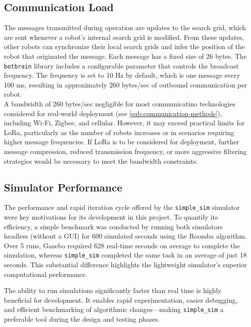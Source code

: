 \subsection{Communication Load}
The messages transmitted during operation are updates to the search grid, which are sent whenever a robot’s internal search grid is modified. From these updates, other robots can synchronize their local search grids and infer the position of the robot that originated the message. Each message has a fixed size of 26 bytes. The \texttt{botbrain} library includes a configurable parameter that controls the broadcast frequency. The frequency is set to 10 Hz by default, which is one message every 100 ms, resulting in approximately 260 bytes/sec of outbound communication per robot. \\

A bandwidth of 260 bytes/sec negligible for most communicatino technologies considered for real-world deployment (see \cref{sub:communication-methods}), including Wi-Fi, Zigbee, and cellular. However, it may exceed practical limits for LoRa, particularly as the number of robots increases or in scenarios requiring higher message frequencies. If LoRa is to be considered for deployment, further message compression, reduced transmission frequency, or more aggressive filtering strategies would be necessary to meet the bandwidth constraints.

\subsection{Simulator Performance}
\label{sec:simulator-performance}
The performance and rapid iteration cycle offered by the \texttt{simple\_sim} simulator were key motivations for its development in this project. To quantify its efficiency, a simple benchmark was conducted by running both simulators headless (without a GUI) for 600 simulated seconds using the Roomba algorithm. Over 5 runs, Gazebo required 628 real-time seconds on average to complete the simulation, whereas \texttt{simple\_sim} completed the same task in an average of just 18 seconds. This substantial difference highlights the lightweight simulator’s superior computational performance.

The ability to run simulations significantly faster than real time is highly beneficial for development. It enables rapid experimentation, easier debugging, and efficient benchmarking of algorithmic changes—making \texttt{simple\_sim} a preferable tool during the design and testing phases.

